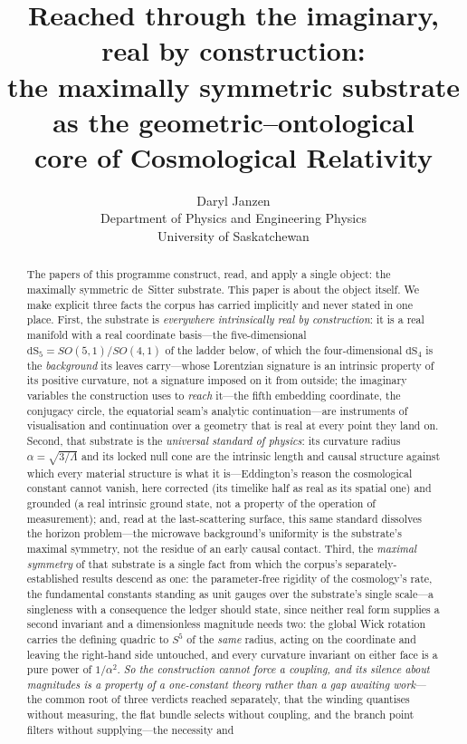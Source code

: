 \documentclass[11pt,a4paper]{article}
\title{Reached through the imaginary, real by construction:\\
\large the maximally symmetric substrate as the geometric--ontological\\
core of Cosmological Relativity}
\author{Daryl Janzen\\
\small Department of Physics and Engineering Physics\\
\small University of Saskatchewan}
\date{}
\theoremstyle{definition}
\begin{document}
\maketitle

\begin{abstract}


The papers of this programme construct, read, and apply a single object:
the maximally symmetric de~Sitter substrate. This paper is about the
object itself. We make explicit three facts the corpus has carried
implicitly and never stated in one place. First, the substrate is
\emph{everywhere intrinsically real by construction}: it is a real
manifold with a real coordinate basis---the five-dimensional
$\mathrm{dS}_5=SO(5,1)/SO(4,1)$ of the ladder below, of which the
four-dimensional $\mathrm{dS}_4$ is the \emph{background} its leaves
carry---whose
Lorentzian signature is an intrinsic property of its positive curvature,
not a signature imposed on it from outside; the imaginary variables the
construction uses to \emph{reach} it---the fifth embedding coordinate, the
conjugacy circle, the equatorial seam's analytic continuation---are
instruments of visualisation and continuation over a geometry that is real
at every point they land on. Second, that substrate is the \emph{universal
standard of physics}: its curvature radius $\alpha=\sqrt{3/\Lambda}$ and its
locked null cone are the intrinsic length and causal structure against which
every material structure is what it is---Eddington's reason the cosmological
constant cannot vanish, here corrected (its timelike half as real as its
spatial one) and grounded (a real intrinsic ground state, not a property of
the operation of measurement); and, read at the last-scattering surface, this
same standard dissolves the horizon problem---the microwave background's
uniformity is the substrate's maximal symmetry, not the residue of an early
causal contact. Third, the \emph{maximal symmetry} of that
substrate is a single fact from which the corpus's separately-established
results descend as one: the parameter-free rigidity of the cosmology's rate, the
fundamental constants standing as unit gauges over the substrate's single
scale---a singleness with a consequence the ledger should state, since neither real form supplies a second invariant and a dimensionless magnitude needs two: the global Wick rotation carries the defining quadric to $S^{5}$ of the \emph{same} radius, acting on the coordinate and leaving the right-hand side untouched, and every curvature invariant on either face is a pure power of $1/\alpha^{2}$. \emph{So the construction cannot force a coupling, and its silence about magnitudes is a property of a one-constant theory rather than a gap awaiting work}---the common root of three verdicts reached separately, that the winding quantises without measuring, the flat bundle selects without coupling, and the branch point filters without supplying---the necessity and

\end{abstract}
\end{document}
